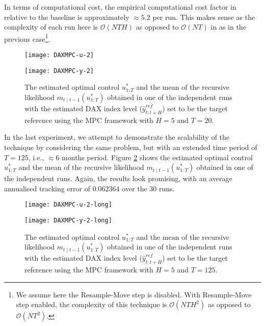 In terms of computational cost, the empirical computational cost factor in relative to the baseline is approximately $\approx 5.2$ per run. This makes sense as the complexity of each run here is  $\mathcal{O}(NTH)$ as opposed to $\mathcal{O}(NT)$ in as in the previous case\footnote{We assume here the Resample-Move step is disabled. With Resample-Move step enabled, the complexity of this technique is $\mathcal{O}(NTH^2)$ as opposed to $\mathcal{O}(NT^2)$.}.

\begin{figure}[htbp]
\centering
    \begin{minipage}{0.5\textwidth}
        \centering
        \texttt{[image: DAXMPC-u-2]}
    \end{minipage}%
    \begin{minipage}{0.5\textwidth}
        \centering
        \texttt{[image: DAXMPC-y-2]}
    \end{minipage}
\caption{The estimated optimal control $u^*_{1:T}$ and the mean of the recursive likelihood $m_{t \mid t-1}(u^*_{1:T})$ obtained in one of the independent runs with the estimated DAX index level ($\hat{y}^{ref}_{t:t+H}$) set to be the target reference using the MPC framework with $H=5$ and $T=20$.}
\label{fig:mpc2}
\end{figure}

In the last experiment, we attempt to demonstrate the scalability of the technique by considering the same problem, but with an extended time period of $T=125$, i.e., $\approx 6$ months period. Figure \ref{fig:mpc2long} shows the estimated optimal control $u^*_{1:T}$ and the mean of the recursive likelihood $m_{t \mid t-1}(u^*_{1:T})$ obtained in one of the independent runs. Again, the results look promising, with an average annualised tracking error of $0.062364$ over the $30$ runs. 

\begin{figure}[htbp]
\centering
    \begin{minipage}{\textwidth}
        \centering
        \texttt{[image: DAXMPC-u-2-long]}
    \end{minipage}
    \begin{minipage}{\textwidth}
        \centering
        \texttt{[image: DAXMPC-y-2-long]}
    \end{minipage}
\caption{The estimated optimal control $u^*_{1:T}$ and the mean of the recursive likelihood $m_{t \mid t-1}(u^*_{1:T})$ obtained in one of the independent runs with the estimated DAX index level ($\hat{y}^{ref}_{t:t+H}$) set to be the target reference using the MPC framework with $H=5$ and $T=125$.}
\label{fig:mpc2long}
\end{figure}

